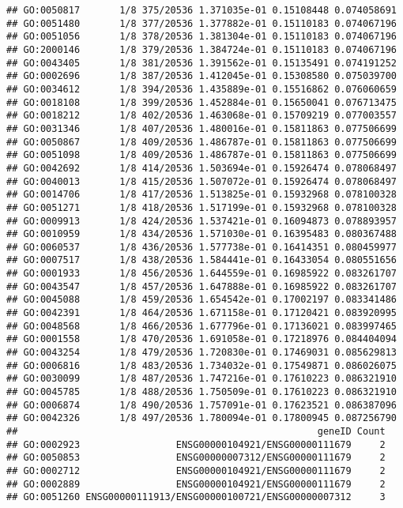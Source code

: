 \documentclass[
]{article}
\begin{document}
\begin{verbatim}
## GO:0050817       1/8 375/20536 1.371035e-01 0.15108448 0.074058691
## GO:0051480       1/8 377/20536 1.377882e-01 0.15110183 0.074067196
## GO:0051056       1/8 378/20536 1.381304e-01 0.15110183 0.074067196
## GO:2000146       1/8 379/20536 1.384724e-01 0.15110183 0.074067196
## GO:0043405       1/8 381/20536 1.391562e-01 0.15135491 0.074191252
## GO:0002696       1/8 387/20536 1.412045e-01 0.15308580 0.075039700
## GO:0034612       1/8 394/20536 1.435889e-01 0.15516862 0.076060659
## GO:0018108       1/8 399/20536 1.452884e-01 0.15650041 0.076713475
## GO:0018212       1/8 402/20536 1.463068e-01 0.15709219 0.077003557
## GO:0031346       1/8 407/20536 1.480016e-01 0.15811863 0.077506699
## GO:0050867       1/8 409/20536 1.486787e-01 0.15811863 0.077506699
## GO:0051098       1/8 409/20536 1.486787e-01 0.15811863 0.077506699
## GO:0042692       1/8 414/20536 1.503694e-01 0.15926474 0.078068497
## GO:0040013       1/8 415/20536 1.507072e-01 0.15926474 0.078068497
## GO:0014706       1/8 417/20536 1.513825e-01 0.15932968 0.078100328
## GO:0051271       1/8 418/20536 1.517199e-01 0.15932968 0.078100328
## GO:0009913       1/8 424/20536 1.537421e-01 0.16094873 0.078893957
## GO:0010959       1/8 434/20536 1.571030e-01 0.16395483 0.080367488
## GO:0060537       1/8 436/20536 1.577738e-01 0.16414351 0.080459977
## GO:0007517       1/8 438/20536 1.584441e-01 0.16433054 0.080551656
## GO:0001933       1/8 456/20536 1.644559e-01 0.16985922 0.083261707
## GO:0043547       1/8 457/20536 1.647888e-01 0.16985922 0.083261707
## GO:0045088       1/8 459/20536 1.654542e-01 0.17002197 0.083341486
## GO:0042391       1/8 464/20536 1.671158e-01 0.17120421 0.083920995
## GO:0048568       1/8 466/20536 1.677796e-01 0.17136021 0.083997465
## GO:0001558       1/8 470/20536 1.691058e-01 0.17218976 0.084404094
## GO:0043254       1/8 479/20536 1.720830e-01 0.17469031 0.085629813
## GO:0006816       1/8 483/20536 1.734032e-01 0.17549871 0.086026075
## GO:0030099       1/8 487/20536 1.747216e-01 0.17610223 0.086321910
## GO:0045785       1/8 488/20536 1.750509e-01 0.17610223 0.086321910
## GO:0006874       1/8 490/20536 1.757091e-01 0.17623521 0.086387096
## GO:0042326       1/8 497/20536 1.780094e-01 0.17800945 0.087256790
##                                                     geneID Count
## GO:0002923                 ENSG00000104921/ENSG00000111679     2
## GO:0050853                 ENSG00000007312/ENSG00000111679     2
## GO:0002712                 ENSG00000104921/ENSG00000111679     2
## GO:0002889                 ENSG00000104921/ENSG00000111679     2
## GO:0051260 ENSG00000111913/ENSG00000100721/ENSG00000007312     3

\end{verbatim}
\end{document}

